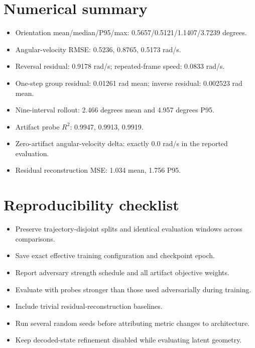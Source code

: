 \documentclass[11pt,a4paper]{article}
\begin{document}
\appendix
\section{Numerical summary}
\begin{itemize}
\item Orientation mean/median/P95/max: 0.5657/0.5121/1.1407/3.7239 degrees.
\item Angular-velocity RMSE: 0.5236, 0.8765, 0.5173 rad/s.
\item Reversal residual: 0.9178 rad/s; repeated-frame speed: 0.0833 rad/s.
\item One-step group residual: 0.01261 rad mean; inverse residual: 0.002523 rad mean.
\item Nine-interval rollout: 2.466 degrees mean and 4.957 degrees P95.
\item Artifact probe $R^2$: 0.9947, 0.9913, 0.9919.
\item Zero-artifact angular-velocity delta: exactly 0.0 rad/s in the reported evaluation.
\item Residual reconstruction MSE: 1.034 mean, 1.756 P95.
\end{itemize}

\section{Reproducibility checklist}
\begin{itemize}
\item Preserve trajectory-disjoint splits and identical evaluation windows across comparisons.
\item Save exact effective training configuration and checkpoint epoch.
\item Report adversary strength schedule and all artifact objective weights.
\item Evaluate with probes stronger than those used adversarially during training.
\item Include trivial residual-reconstruction baselines.
\item Run several random seeds before attributing metric changes to architecture.
\item Keep decoded-state refinement disabled while evaluating latent geometry.
\end{itemize}


\end{document}
